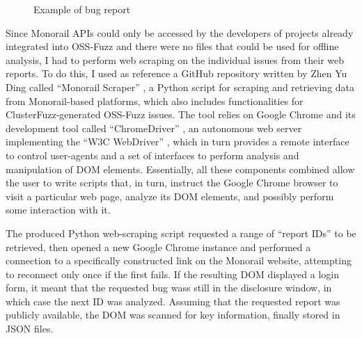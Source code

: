 \begin{figure}[h]
\caption{Example of bug report \cite{ossfuzz_bugtracker}}
\label{fig:issue}
\end{figure}

Since Monorail APIs could only be accessed by the developers of projects already integrated into OSS-Fuzz and there were no files that could be used for offline analysis, I had to perform web scraping on the individual issues from their web reports. To do this, I used as reference a GitHub repository written by Zhen Yu Ding called ``Monorail Scraper'' \cite{scraper}, a Python script for scraping and retrieving data from Monorail-based platforms, which also includes functionalities for ClusterFuzz-generated OSS-Fuzz issues. The tool relies on Google Chrome and its development tool called ``ChromeDriver'' \cite{driver}, an autonomous web server implementing the ``W3C WebDriver'' \cite{driver_standard}, which in turn provides a remote interface to control user-agents and a set of interfaces to perform analysis and manipulation of DOM elements. Essentially, all these components combined allow the user to write scripts that, in turn, instruct the Google Chrome browser to visit a particular web page, analyze its DOM elements, and possibly perform some interaction with it.


\newpage
The produced Python web-scraping script requested a range of ``report IDs'' to be retrieved, then opened a new Google Chrome instance and performed a connection to a specifically constructed link on the Monorail website, attempting to reconnect only once if the first fails. If the resulting DOM displayed a login form, it meant that the requested bug wass still in the disclosure window, in which case the next ID was analyzed. Assuming that the requested report was publicly available, the DOM was scanned for key information, finally stored in JSON files. 
\newline

